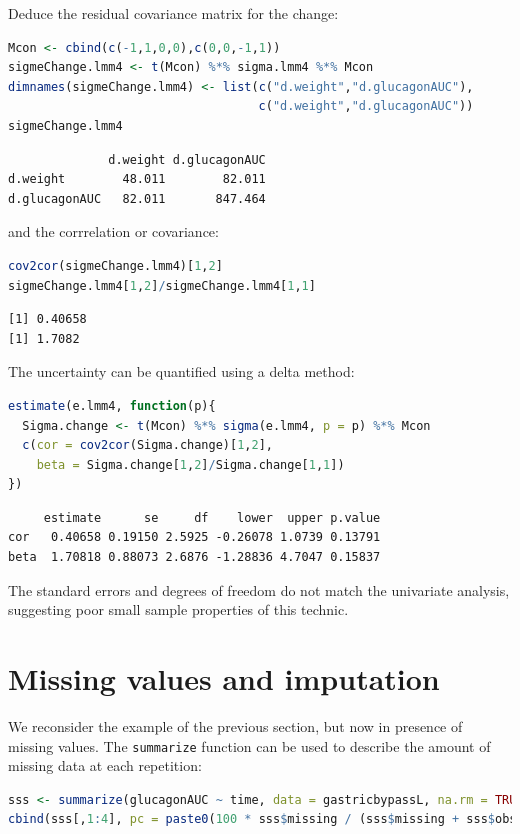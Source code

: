 \documentclass[12pt]{article}
\begin{document}
Deduce the residual covariance matrix for the change:
\begin{lstlisting}[language=r,numbers=none]
Mcon <- cbind(c(-1,1,0,0),c(0,0,-1,1))
sigmeChange.lmm4 <- t(Mcon) %*% sigma.lmm4 %*% Mcon
dimnames(sigmeChange.lmm4) <- list(c("d.weight","d.glucagonAUC"),
                                   c("d.weight","d.glucagonAUC"))
sigmeChange.lmm4
\end{lstlisting}

\label{}
\begin{verbatim}
              d.weight d.glucagonAUC
d.weight        48.011        82.011
d.glucagonAUC   82.011       847.464
\end{verbatim}


and the corrrelation or covariance:
\begin{lstlisting}[language=r,numbers=none]
cov2cor(sigmeChange.lmm4)[1,2]
sigmeChange.lmm4[1,2]/sigmeChange.lmm4[1,1]
\end{lstlisting}

\label{}
\begin{verbatim}
[1] 0.40658
[1] 1.7082
\end{verbatim}


The uncertainty can be quantified using a delta method:
\begin{lstlisting}[language=r,numbers=none]
estimate(e.lmm4, function(p){
  Sigma.change <- t(Mcon) %*% sigma(e.lmm4, p = p) %*% Mcon
  c(cor = cov2cor(Sigma.change)[1,2],
    beta = Sigma.change[1,2]/Sigma.change[1,1])
})
\end{lstlisting}

\label{}
\begin{verbatim}
     estimate      se     df    lower  upper p.value
cor   0.40658 0.19150 2.5925 -0.26078 1.0739 0.13791
beta  1.70818 0.88073 2.6876 -1.28836 4.7047 0.15837
\end{verbatim}


The standard errors and degrees of freedom do not match the univariate
analysis, suggesting poor small sample properties of this
technic.

\clearpage
\section{Missing values and imputation}
\label{sec:orgc7cc8cd}

We reconsider the example of the previous section, but now in presence
of missing values. The \texttt{summarize} function can be used to describe
the amount of missing data at each repetition:
\begin{lstlisting}[language=r,numbers=none]
sss <- summarize(glucagonAUC ~ time, data = gastricbypassL, na.rm = TRUE)
cbind(sss[,1:4], pc = paste0(100 * sss$missing / (sss$missing + sss$observed), "%"))
\end{lstlisting}
\end{document}
